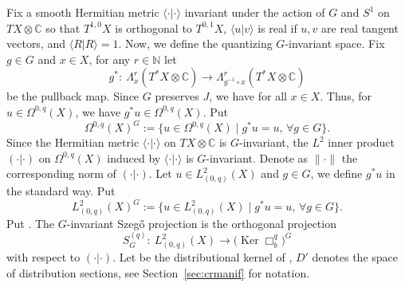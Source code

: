 \documentclass[pdftex]{sigma}
\numberwithin{equation}{section}
\newcommand{\To}{\rightarrow}
\begin{document}
Fix a smooth Hermitian metric $\langle \cdot | \cdot \rangle$ invariant under the action of $G$ and $S^1$ on $TX\otimes \mathbb{C}$ so that $T^{1,0}X$ is orthogonal to $T^{0,1}X$, $\langle u | v \rangle$ is real if $u, v$ are real tangent vectors, and $\langle R | R \rangle=1$. Now, we define the quantizing $G$-invariant space. Fix $g\in G$ and $x\in X$, for any $r\in \mathbb{N}$ let
\[
g^*\colon \
\Lambda^r_x(T^*X\otimes \mathbb{C})\To\Lambda^r_{g^{-1}\circ x}( T^*X\otimes \mathbb{C})
\]
 be the pullback map. Since $G$ preserves $J$, we have
\smash{$
g^*\colon T^{*0,q}_xX\To T^{*0,q}_{g^{-1}\circ x}X
$}
 for all $x\in X$. Thus, for $u\in\Omega^{0,q}(X)$, we have $g^*u\in\Omega^{0,q}(X)$. Put
 \[\Omega^{0,q}(X)^G:=\big\{u\in\Omega^{0,q}(X) \mid g^*u=u,\,\forall g\in G\big\} .
 \]
	Since the Hermitian metric $\langle \cdot | \cdot \rangle$ on $TX\otimes \mathbb{C}$ is $G$-invariant, the $L^2$ inner product $( \cdot | \cdot )$ on $\Omega^{0,q}(X)$
	induced by $\langle \cdot | \cdot \rangle$ is $G$-invariant. Denote as $\lVert \cdot\rVert$ the corresponding norm of $( \cdot | \cdot )$. Let $u\in L^2_{(0,q)}(X)$ and $g\in G$, we define $g^*u$ in the standard way. Put
	\[L^2_{(0,q)}(X)^G:=\big\{u\in L^2_{(0,q)}(X)\mid g^*u=u,\,\forall g\in G\big\}.\]
	Put
. The $G$-invariant Szeg\H{o} projection is the orthogonal projection
	\[S^{(q)}_G\colon \ L^2_{(0,q)}(X)\To \bigl(\operatorname{Ker}\Box^q_b\bigr)^G\]
	with respect to $( \cdot | \cdot )$. Let  be the distributional kernel of , ${D}'$ denotes the space of distribution sections, see Section~\ref{sec:crmanif} for notation.
	
\end{document}
